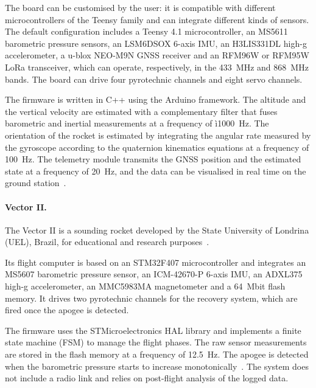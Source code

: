 The board can be customised by the user: it is compatible with different microcontrollers of the Teensy family and can integrate different kinds of sensors. The default configuration includes a Teensy 4.1 microcontroller, an MS5611 barometric pressure sensors, an LSM6DSOX 6-axis IMU, an H3LIS331DL high-g accelerometer, a u-blox NEO-M9N GNSS receiver and an RFM96W or RFM95W LoRa transceiver, which can operate, respectively, in the \SI{433}{MHz} and \SI{868}{MHz} bands. The board can drive four pyrotechnic channels and eight servo channels.

The firmware is written in C++ using the Arduino framework. The altitude and the vertical velocity are estimated with a complementary filter that fuses barometric and inertial measurements at a frequency of ì\SI{1000}{Hz}. 
The orientation of the rocket is estimated by integrating the angular rate measured by the gyroscope according to the quaternion kinematics equations at a frequency of \SI{100}{Hz}.
The telemetry module transmits the GNSS position and the estimated state at a frequency of \SI{20}{Hz}, and the data can be visualised in real time on the ground station~\cite{sparkyvt:hpr-repo}. 

\paragraph{Vector II.} The Vector II is a sounding rocket developed by the State University of Londrina (UEL), Brazil, for educational and research purposes~\cite{NETZEL2026e00803}.

Its flight computer is based on an STM32F407 microcontroller and integrates an MS5607 barometric pressure sensor, an ICM-42670-P 6-axis IMU, an ADXL375 high-g accelerometer, an MMC5983MA magnetometer and a \SI{64}{Mbit} flash memory. It drives two pyrotechnic channels for the recovery system, which are fired once the apogee is detected.

The firmware uses the STMicroelectronics HAL library and implements a finite state machine (FSM) to manage the flight phases. The raw sensor measurements are stored in the flash memory at a frequency of \SI{12.5}{Hz}. The apogee is detected when the barometric pressure starts to increase monotonically~\cite{NETZEL2026e00803}. The system does not include a radio link and relies on post-flight analysis of the logged data.

